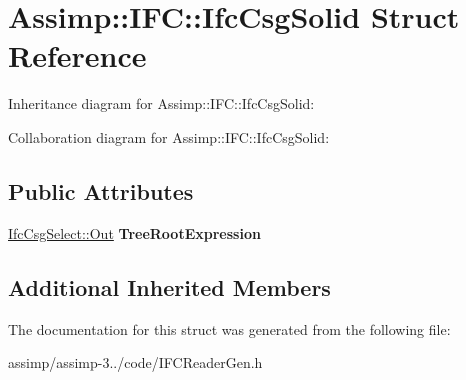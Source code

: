 \hypertarget{struct_assimp_1_1_i_f_c_1_1_ifc_csg_solid}{\section{Assimp\+:\+:I\+F\+C\+:\+:Ifc\+Csg\+Solid Struct Reference}
\label{struct_assimp_1_1_i_f_c_1_1_ifc_csg_solid}
}


Inheritance diagram for Assimp\+:\+:I\+F\+C\+:\+:Ifc\+Csg\+Solid\+:


Collaboration diagram for Assimp\+:\+:I\+F\+C\+:\+:Ifc\+Csg\+Solid\+:
\subsection*{Public Attributes}
\begin{DoxyCompactItemize}
\item 
\hypertarget{struct_assimp_1_1_i_f_c_1_1_ifc_csg_solid_adf72dec021f6c611cba3c40d8c30752e}{\hyperlink{classboost_1_1shared__ptr}{Ifc\+Csg\+Select\+::\+Out} {\bfseries Tree\+Root\+Expression}}\label{struct_assimp_1_1_i_f_c_1_1_ifc_csg_solid_adf72dec021f6c611cba3c40d8c30752e}

\end{DoxyCompactItemize}
\subsection*{Additional Inherited Members}


The documentation for this struct was generated from the following file\+:\begin{DoxyCompactItemize}
\item 
assimp/assimp-\/3../code/I\+F\+C\+Reader\+Gen.\+h\end{DoxyCompactItemize}
